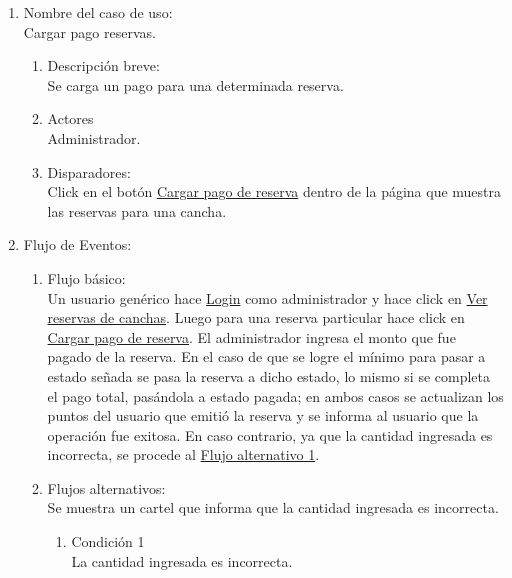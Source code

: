 \documentclass[a4paper,11pt]{article}
\begin{document}

\begin{enumerate}

    \item Nombre del caso de uso: \\
    Cargar pago reservas.

    \begin{enumerate}
    \item Descripción breve: \\
        Se carga un pago para una determinada reserva.
    \item Actores \\
        Administrador.
    \item Disparadores: \\
        Click en el botón \underline{Cargar pago de reserva} dentro de la
        página que muestra las reservas para una cancha.
    \end{enumerate}

    \item Flujo de Eventos: \\

    \begin{enumerate}

        \item Flujo básico:\\
            Un usuario genérico hace \underline{Login} como administrador y
            hace click en \underline{Ver reservas de canchas}. Luego para una
            reserva particular hace click en
            \underline{Cargar pago de reserva}. El administrador ingresa el
            monto que fue pagado de la reserva. En el caso de que se logre el
            mínimo para pasar a estado señada se pasa la reserva a dicho
            estado, lo mismo si se completa el pago total, pasándola a estado
            pagada; en ambos casos se actualizan los puntos del usuario que
            emitió la reserva y se informa al usuario que la operación fue
            exitosa. En caso contrario, ya que la cantidad ingresada es
            incorrecta, se procede al \underline{Flujo alternativo 1}. 


        \item Flujos alternativos:\\
            Se muestra un cartel que informa que la cantidad ingresada es
            incorrecta.
            \begin{enumerate}
                \item Condición 1 \\
                    La cantidad ingresada es incorrecta.
            \end{enumerate}


\end{enumerate}
\end{enumerate}
\end{document}
